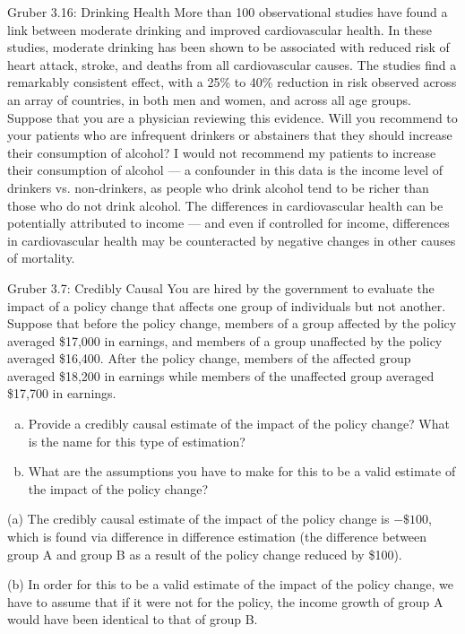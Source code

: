 \documentclass[10pt]{extarticle}
\begin{document}
  \begin{problem}{Gruber 3.16: Drinking Health}
    More than 100 observational studies have found a link between moderate drinking and improved cardiovascular health. In these studies, moderate drinking has been shown to be associated with reduced risk of heart attack, stroke, and deaths from all cardiovascular causes. The studies find a remarkably consistent effect, with a 25\% to 40\% reduction in risk observed across an array of countries, in both men and women, and across all age groups. Suppose that you are a physician reviewing this evidence. Will you recommend to your patients who are infrequent drinkers or abstainers that they should increase their consumption of alcohol?
    \tcblower
    I would not recommend my patients to increase their consumption of alcohol --- a confounder in this data is the income level of drinkers vs. non-drinkers, as people who drink alcohol tend to be richer than those who do not drink alcohol. The differences in cardiovascular health can be potentially attributed to income --- and even if controlled for income, differences in cardiovascular health may be counteracted by negative changes in other causes of mortality.
  \end{problem}
  \begin{problem}{Gruber 3.7: Credibly Causal}
    You are hired by the government to evaluate the impact of a policy change that affects one group of individuals but not another. Suppose that before the policy change, members of a group affected by the policy averaged \$17,000 in earnings, and members of a group unaffected by the policy averaged \$16,400. After the policy change, members of the affected group averaged \$18,200 in earnings while members of the unaffected group averaged \$17,700 in earnings.
    \begin{enumerate}[(a)]
      \item Provide a credibly causal estimate of the impact of the policy change? What is the name for this type of estimation?
      \item What are the assumptions you have to make for this to be a valid estimate of the impact of the policy change?
    \end{enumerate}
    \begin{problem}{(a)}
      The credibly causal estimate of the impact of the policy change is $-\$100$, which is found via difference in difference estimation (the difference between group A and group B as a result of the policy change reduced by \$100).
    \end{problem}
    \begin{problem}{(b)}
      In order for this to be a valid estimate of the impact of the policy change, we have to assume that if it were not for the policy, the income growth of group A would have been identical to that of group B.
    \end{problem}
  \end{problem}
\end{document}
